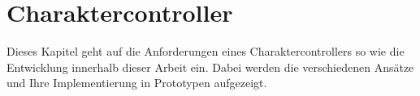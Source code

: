 \chapter{Charaktercontroller}
\label{sec:charaktercontroller}
Dieses Kapitel geht auf die Anforderungen eines Charaktercontrollers so wie die Entwicklung innerhalb dieser Arbeit ein. Dabei werden die verschiedenen Ansätze und Ihre Implementierung in Prototypen aufgezeigt.



